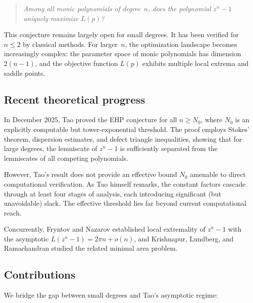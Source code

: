 \documentclass[11pt]{article}
\theoremstyle{plain}
\theoremstyle{definition}
\theoremstyle{remark}
\begin{document}
\begin{quote}
\emph{Among all monic polynomials of degree~$n$, does the polynomial $z^n - 1$ uniquely maximize $L(p)$?}
\end{quote}

This conjecture remains largely open for small degrees. It has been verified for $n \leq 2$ by classical methods. For larger~$n$, the optimization landscape becomes increasingly complex: the parameter space of monic polynomials has dimension $2(n-1)$, and the objective function $L(p)$ exhibits multiple local extrema and saddle points.

\subsection{Recent theoretical progress}

In December 2025, Tao \cite{Tao2025} proved the EHP conjecture for all $n \geq N_0$, where $N_0$ is an explicitly computable but tower-exponential threshold. The proof employs Stokes' theorem, dispersion estimates, and defect triangle inequalities, showing that for large degrees, the lemniscate of $z^n - 1$ is sufficiently separated from the lemniscates of all competing polynomials.

However, Tao's result does not provide an effective bound $N_0$ amenable to direct computational verification. As Tao himself remarks, the constant factors cascade through at least four stages of analysis, each introducing significant (but unavoidable) slack. The effective threshold lies far beyond current computational reach.

Concurrently, Fryntov and Nazarov \cite{FN2025} established local extremality of $z^n - 1$ with the asymptotic $L(z^n - 1) = 2\pi n + o(n)$, and Krishnapur, Lundberg, and Ramachandran \cite{KLR2025} studied the related minimal area problem.

\subsection{Contributions}

We bridge the gap between small degrees and Tao's asymptotic regime:
\end{document}

